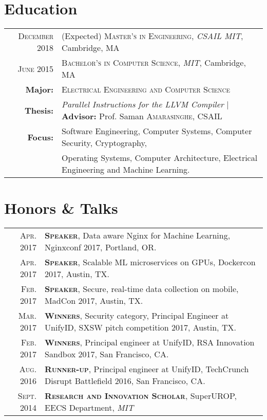 \documentclass[lettersize,10pt]{article}
\begin{document}
\section{Education}
\begin{tabular}{rl}

\textsc{December} 2018 & (Expected) \textsc{Master's in Engineering}, \emph{CSAIL MIT}, Cambridge, MA\\
\textsc{June} 2015 & \textsc{Bachelor's in Computer Science}, \emph{MIT}, Cambridge, MA\\
\textbf{Major:} & \textsc{Electrical Engineering and Computer Science}\\
\textbf{Thesis:} & \emph{Parallel Instructions for the LLVM Compiler} | \textbf{Advisor:} Prof. Saman \textsc{Amarasinghe}, CSAIL\\
\textbf{Focus:} &  Software Engineering, Computer Systems, Computer Security, Cryptography, \\
& Operating Systems, Computer Architecture, Electrical Engineering and Machine Learning.\\
\end{tabular}

\section{Honors \& Talks}
\begin{tabular}{rl}
    \textsc{Apr.} 2017 & \textsc{\textbf{Speaker}}, Data aware Nginx for Machine Learning, Nginxconf 2017, Portland, OR. \\
    \textsc{Apr.} 2017 & \textsc{\textbf{Speaker}}, Scalable ML microservices on GPUs, Dockercon 2017, Austin, TX. \\
    \textsc{Feb.} 2017 & \textsc{\textbf{Speaker}}, Secure, real-time data collection on mobile, MadCon 2017, Austin, TX. \\
    \textsc{Mar.} 2017 & \textsc{\textbf{Winners}}, Security category, Principal Engineer at UnifyID, SXSW pitch competition 2017, Austin, TX. \\
    \textsc{Feb.} 2017 & \textsc{\textbf{Winners}}, Principal engineer at UnifyID, RSA Innovation Sandbox 2017, San Francisco, CA. \\
    \textsc{Aug.} 2016 & \textsc{\textbf{Runner-up}}, Principal engineer at UnifyID, TechCrunch Disrupt Battlefield 2016, San Francisco, CA. \\
    \textsc{Sept.} 2014 & \textsc{\textbf{Research and Innovation Scholar}}, SuperUROP, EECS Department, \emph{MIT}\\
\end{tabular}
\end{document}
